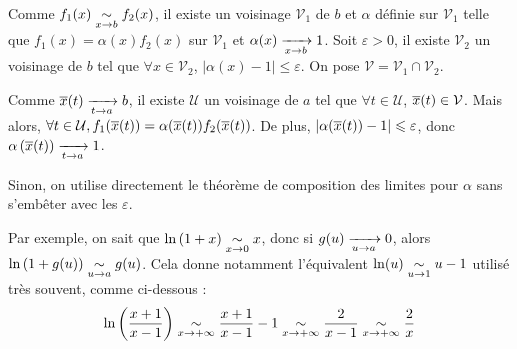 \documentclass{magnoliaold}
\begin{document}
\begin{preuve}
Comme $\displaystyle f_1(x)\underset{x\rightarrow b}{\sim}f_2(x)$, il existe un voisinage $\mathcal{V}_1$ de $b$ et $\alpha$ définie sur $\mathcal{V}_1$ telle que $f_1(x)=\alpha(x)f_2(x)$ sur $\mathcal{V}_1$ et $\alpha(x)\xrightarrow[x\rightarrow b]{}1$. Soit $\varepsilon>0$, il existe $\mathcal{V}_2$ un voisinage de $b$ tel que $\forall x\in \mathcal{V}_2$, $|\alpha(x)-1|\leq \varepsilon$. On pose $\mathcal{V}=\mathcal{V}_1\cap\mathcal{V}_2$.

\smallskip
Comme $\displaystyle \overline{x}(t)\xrightarrow[t\rightarrow a]{}b$, il existe $\mathcal{U}$ un voisinage de $a$ tel que $\forall t \in \mathcal{U}$, $\overline{x}(t) \in \mathcal{V}$. Mais alors, $\forall t \in \mathcal{U}, f_1(\overline{x}(t))=\alpha(\overline{x}(t))f_2(\overline{x}(t))$. De plus, $|\alpha(\overline{x}(t))-1|\leqslant \varepsilon$, donc $\alpha\left(\overline{x}(t)\right)\xrightarrow[t\rightarrow a]{}1$.

Sinon, on utilise directement le théorème de composition des limites pour $\alpha$ sans s'embêter avec les $\varepsilon$.

\end{preuve}

\begin{victor}
\begin{remarqueUnique}
\remarque Par exemple, on sait que $\ln\left(1+x\right)\underset{x\rightarrow 0}{\sim}x$, donc si $g(u)\xrightarrow[u\rightarrow a]{}0$, alors $\ln\left(1+g(u)\right)\underset{u\rightarrow a}{\sim}g(u)$. Cela donne notamment l'équivalent $\ln(u)\underset{u\rightarrow 1}{\sim}u-1$ utilisé très souvent, comme ci-dessous :
$$\ln\left(\frac{x+1}{x-1}\right)\underset{x\rightarrow +\infty}{\sim}\frac{x+1}{x-1}-1\underset{x\rightarrow +\infty}{\sim}\frac{2}{x-1}\underset{x\rightarrow +\infty}{\sim}\frac{2}{x}$$
\end{remarqueUnique}
\end{victor}
\end{document}
